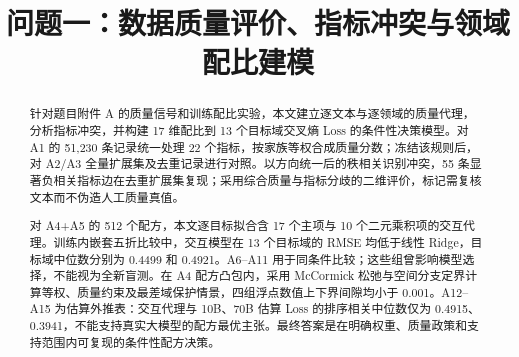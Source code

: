 \documentclass[bwprint,withoutpreface]{gmcmthesis}
\title{问题一：数据质量评价、指标冲突与领域配比建模}
\begin{document}
\maketitle
\begin{abstract}
针对题目附件 A 的质量信号和训练配比实验，本文建立逐文本与逐领域的质量代理，分析指标冲突，并构建 17 维配比到 13 个目标域交叉熵 Loss 的条件性决策模型。对 A1 的 51,230 条记录统一处理 22 个指标，按家族等权合成质量分数；冻结该规则后，对 A2/A3 全量扩展集及去重记录进行对照。以方向统一后的秩相关识别冲突，55 条显著负相关指标边在去重扩展集复现；采用综合质量与指标分歧的二维评价，标记需复核文本而不伪造人工质量真值。

对 A4+A5 的 512 个配方，本文逐目标拟合含 17 个主项与 10 个二元乘积项的交互代理。训练内嵌套五折比较中，交互模型在 13 个目标域的 RMSE 均低于线性 Ridge，目标域中位数分别为 0.4499 和 0.4921。A6--A11 用于同条件比较；这些组曾影响模型选择，不能视为全新盲测。在 A4 配方凸包内，采用 McCormick 松弛与空间分支定界计算等权、质量约束及最差域保护情景，四组浮点数值上下界间隙均小于 0.001。A12--A15 为估算外推表：交互代理与 10B、70B 估算 Loss 的排序相关中位数仅为 0.4915、0.3941，不能支持真实大模型的配方最优主张。最终答案是在明确权重、质量政策和支持范围内可复现的条件性配方决策。
\end{abstract}
\maketoc
\clearpage





\end{document}
